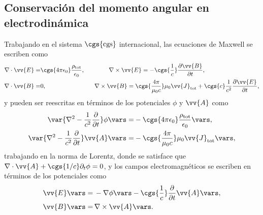\subsection{Conservación del momento angular en electrodinámica}
Trabajando en el sistema $\cgs{\text{cgs}}$ internacional, las ecuaciones de Maxwell se escriben como \cite{jackson}
\begin{align}
\nabla\cdot\vv{E} =& \cgs{4\pi\epsilon_0}\frac{\rho_{\text{tot}}}{\epsilon_0}, \qquad \qquad \nabla\times\vv{E}=-\cgs{\frac{1}{c}}\frac{\partial\vv{B}}{\partial t}, \nonumber \\
\nabla\cdot\vv{B} =& 0, \qquad \qquad \qquad \qquad \nabla\times\vv{B}=\cgs{\frac{4\pi}{\mu_0 c}}\mu_0\vv{J}_{\text{tot}}+\cgs{c}\frac{1}{c^2}\frac{\partial\vv{E}}{\partial t},
\label{eq: Maxwell equations}
\end{align}
y pueden ser reescritas en términos de los potenciales $\phi$ y $\vv{A}$ como \cite{jackson}
\begin{align}
\var{\nabla^2 -\frac{1}{c^2}\frac{\partial}{\partial t}}\phi\vars =& - \cgs{4\pi\epsilon_0} \frac{\rho_{\text{tot}}}{\epsilon_0}\vars, \label{eq: scalar potential}\\
\var{\nabla^2 -\frac{1}{c^2}\frac{\partial}{\partial t}}\vv{A}\vars =& - \cgs{\frac{4\pi}{\mu_0 c}}\mu_0 \vv{J}_{\text{tot}}\vars,\label{eq: vector potential}
\end{align}
trabajando en la norma de Lorentz, donde se satisface que $\nabla\cdot\vv{A}+\cgs{1/c}\partial_t \phi =0$, y los campos electromagnéticos se escriben en términos de los potenciales como
\begin{align}
\vv{E}\vars =& \, -\nabla\phi\vars - \cgs{\frac{1}{c}}\frac{\partial}{\partial t}\vv{A}\vars, \label{eq: E field potentials}\\
\vv{B}\vars =& \, \nabla\times\vv{A}\vars. \label{eq: B field potentials}
\end{align}

